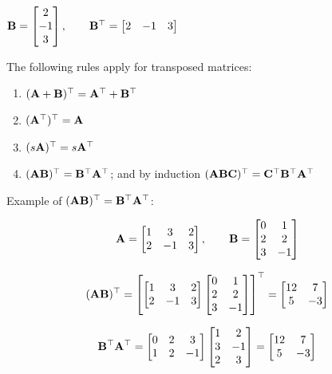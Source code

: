 \documentclass[
  letterpaper,
]{book}
\providecommand{\tightlist}{%
  \setlength{\itemsep}{0pt}\setlength{\parskip}{0pt}}\usepackage{longtable,booktabs,array}
\theoremstyle{definition}
\theoremstyle{definition}
\theoremstyle{plain}
\theoremstyle{definition}
\theoremstyle{plain}
\theoremstyle{plain}
\theoremstyle{remark}
\begin{document}
\({\bf B}=\begin{bmatrix} 2\\-1\\3 \end{bmatrix}, \qquad {\bf B}^\top=\begin{bmatrix} 2&-1&3\end{bmatrix}\)

The following rules apply for transposed matrices:

\begin{enumerate}
\def\labelenumi{\arabic{enumi}.}
\tightlist
\item
  \(({\bf A+B})^\top = {\bf A}^\top+{\bf B}^\top\)
\item
  \(({\bf A}^\top)^\top={\bf A}\)
\item
  \((s{\bf A})^\top = s{\bf A}^\top\)
\item
  \(({\bf AB})^\top = {\bf B}^\top{\bf A}^\top\); and by induction
  \(({\bf ABC})^\top = {\bf C}^\top{\bf B}^\top{\bf A}^\top\)
\end{enumerate}

Example of \(({\bf AB})^\top = {\bf B}^\top{\bf A}^\top\):

\[{\bf A}=\begin{bmatrix} 1&3&2\\2&-1&3\end{bmatrix}, \qquad {\bf B}=\begin{bmatrix} 0&1\\2&2\\3&-1\end{bmatrix}\]

\[ ({\bf AB})^\top = \left[ \begin{bmatrix} 1&3&2\\2&-1&3\end{bmatrix} \begin{bmatrix} 0&1\\2&2\\3&-1\end{bmatrix} \right]^\top = \begin{bmatrix} 12&7\\5&-3 \end{bmatrix}\]

\[ {\bf B}^\top{\bf A}^\top= \begin{bmatrix} 0&2&3\\1&2&-1 \end{bmatrix}  \begin{bmatrix} 1&2\\3&-1\\2&3 \end{bmatrix} = \begin{bmatrix} 12&7\\5&-3 \end{bmatrix}\]
\end{document}
